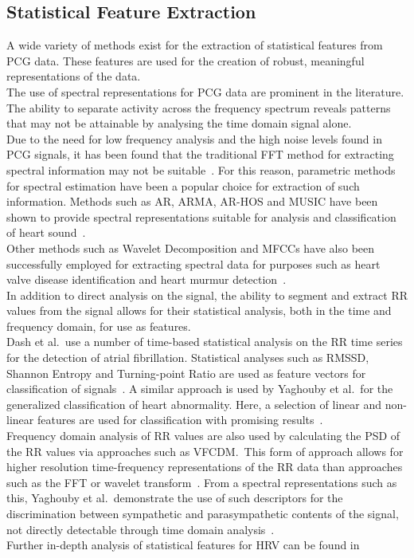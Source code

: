 \documentclass[titlepage, 12pt]{scrartcl} \usepackage{enumitem}
\begin{document}
\subsection{Statistical Feature Extraction}
A wide variety of methods exist for the extraction of statistical
features from PCG data. These features are used for the creation of
robust, meaningful representations of the data.\\
The use of spectral representations for PCG data are prominent in the
literature. The ability to separate activity across the frequency
spectrum reveals patterns that may not be attainable by analysing the
time domain signal alone.\\
Due to the need for low frequency analysis and the high noise levels
found in PCG signals, it has been found that the traditional FFT
method for extracting spectral information may not be
suitable~\parencite{Akay1990}. For this reason, parametric methods for
spectral estimation have been a popular choice for extraction of such information.
Methods such as AR, ARMA, AR-HOS and MUSIC have been shown to provide spectral
representations suitable for analysis and classification of heart
sound~\parencite{Ergen2001, Schmidt2015}.\\
Other methods such as Wavelet Decomposition and MFCCs have also been
successfully  employed for extracting spectral data for purposes such
as heart valve disease identification and heart murmur
detection~\parencite{Quiceno-Manrique2010a, Maglogiannis2009}.\\

In addition to direct analysis on the signal, the ability to segment
and extract RR values from the signal allows for their statistical
analysis, both in the time and frequency domain, for use as features.\\
Dash et al.\ use a number of time-based statistical analysis on the RR
time series for the detection of atrial fibrillation. Statistical
analyses such as RMSSD, Shannon Entropy and Turning-point Ratio are
used as feature vectors for classification of
signals~\citeyearpar{Dash2009}.  A similar approach is used by Yaghouby
et al.\ for the generalized classification of heart abnormality. Here,
a selection of linear and non-linear features are used for
classification with promising results~\citeyearpar{Yaghouby2009}.\\
Frequency domain analysis of RR values are also used by calculating the
PSD of the RR values via  approaches such as VFCDM.\ This form of
approach allows for higher resolution time-frequency representations of
the RR data than approaches such as the FFT or wavelet transform~\parencite{Wang2006}.
From a spectral representations such as this, Yaghouby et al.\
demonstrate the use of such descriptors for the discrimination between
sympathetic and parasympathetic contents of the signal, not directly
detectable through time domain analysis~\citeyearpar{Yaghouby2009}.\\
Further in-depth analysis of statistical features for HRV can be found
in~\parencite{Electrophysiology1996}
\end{document}
